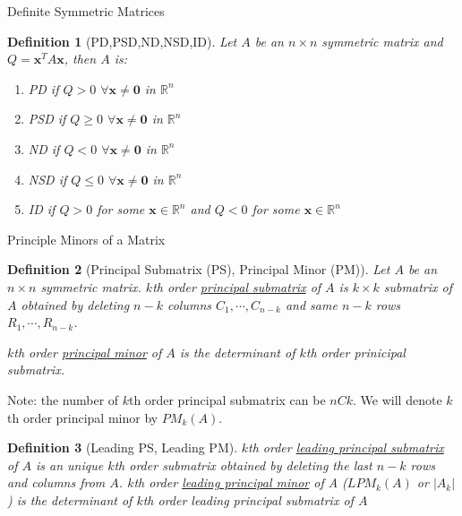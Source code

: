 \documentclass[a4paper,11pt]{article}
\newtheorem{defn}{Definition}
\newcommand{\bb}{\mathbb}
\newcommand{\bd}{\mathbf}
\begin{document}
\begin{frame}[t]{Definite Symmetric Matrices}
	\begin{defn}
		[PD,PSD,ND,NSD,ID]
		Let $A$ be an $n\times n$ symmetric matrix and $Q=\bd{x}^T A \bd{x}$, then $A$ is:
		\begin{enumerate}
			\item PD if $Q>0$ $\forall\bd{x}\neq\bd{0}$ in $\bb{R}^n$
			\item PSD if $Q\ge0$ $\forall\bd{x}\neq\bd{0}$ in $\bb{R}^n$
			\item ND if $Q<0$ $\forall\bd{x}\neq\bd{0}$ in $\bb{R}^n$
			\item NSD if $Q\le 0$ $\forall\bd{x}\neq\bd{0}$ in $\bb{R}^n$
			\item ID if $Q>0$ for some $\bd{x}\in \bb{R}^n$ and $Q<0$ for some $\bd{x}\in\bb{R}^n$
		\end{enumerate}
	\end{defn}
\end{frame}

\begin{frame}[t]{Principle Minors of a Matrix}
	\begin{defn}
		[Principal Submatrix (PS), Principal Minor (PM)]
		Let $A$ be an $n\times n$ symmetric matrix. $k$th order \uline{principal submatrix} of $A$ is $k\times k$ submatrix of $A$ obtained by deleting $n-k$ columns $C_1,\cdots,C_{n-k}$ and same $n-k$ rows $R_1,\cdots,R_{n-k}$. 
		
		$k$th order \uline{principal minor} of $A$ is the determinant of $k$th order prinicipal submatrix.
	\end{defn}
	Note: the number of $k$th order principal submatrix can be $nCk$. We will denote $k$th order principal minor by $PM_k(A)$.
	\begin{defn}
		[Leading PS, Leading PM]
		$k$th order \uline{leading principal submatrix} of $A$ is an unique $k$th order submatrix obtained by deleting the last $n-k$ rows and columns from $A$. $k$th order \uline{leading principal minor} of A ($LPM_k(A)$  or $|A_k|$) is the determinant of $k$th order leading principal submatrix of $A$
	\end{defn}
\end{frame}
\end{document}
